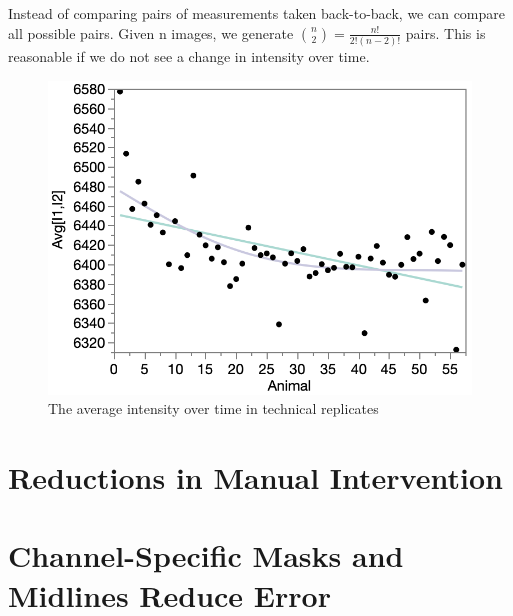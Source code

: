 Instead of comparing pairs of measurements taken back-to-back, we can compare all possible pairs. Given n images, we generate ${n \choose 2} = \frac{n!}{2!(n-2)!}$ pairs. This is reasonable if we do not see a change in intensity over time.

\begin{figure}[ht]
    \centering
    \includegraphics[scale=0.35]{Figures/rendered_files/intensity_over_time}
    \decoRule
    \caption[Average intensity over time in technical replicates]{The average intensity over time in technical replicates}
    \label{fig:DorsalVentralCartoon}
\end{figure}

\section{Reductions in Manual Intervention}


\section{Channel-Specific Masks and Midlines Reduce Error}

